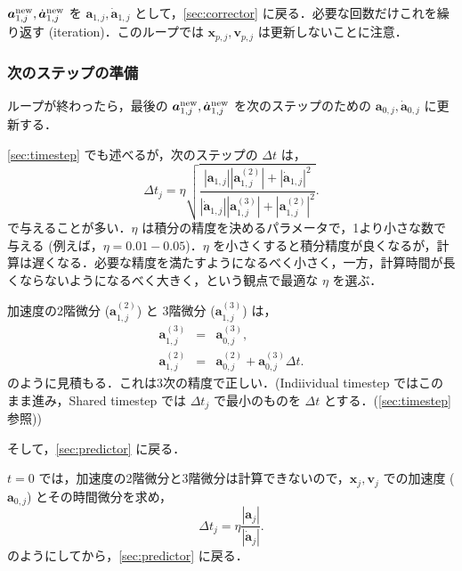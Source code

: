 \documentclass[11pt,a4paper,oneside,onecolumn]{jarticle}
\begin{document}
${\bm a}_{1,j}^{\rm new}, \dot{{\bm a}}_{1,j}^{\rm new}$ を ${\bm a}_{1,j}, \dot{{\bm a}}_{1,j}$ として，\ref{sec:corrector} に戻る．必要な回数だけこれを繰り返す (iteration)．このループでは ${\bm x}_{p,j}, {\bm v}_{p,j}$ は更新しないことに注意．

\subsubsection{次のステップの準備}
ループが終わったら，最後の ${\bm a}_{1,j}^{\rm new}, \dot{{\bm a}}_{1,j}^{\rm new}$ を次のステップのための ${\bm a}_{0,j}, \dot{{\bm a}}_{0,j}$ に更新する．

\ref{sec:timestep} でも述べるが，次のステップの $\Delta t$ は，
\begin{equation}
\Delta t_j = \eta \sqrt{\frac{| {\bm a}_{1,j} | | {\bm a}_{1,j}^{(2)} | + | \dot{{\bm a}}_{1,j} | ^2}{| \dot{{\bm a}}_{1,j} | | {\bm a}_{1,j}^{(3)} | + | {\bm a}_{1,j}^{(2)} | ^2}}.
\end{equation}
で与えることが多い．$\eta$ は積分の精度を決めるパラメータで，1より小さな数で与える (例えば，$\eta = 0.01 - 0.05$)．$\eta$ を小さくすると積分精度が良くなるが，計算は遅くなる．必要な精度を満たすようになるべく小さく，一方，計算時間が長くならないようになるべく大きく，という観点で最適な $\eta$ を選ぶ．

加速度の2階微分 (${\bm a}_{1,j}^{(2)}$) と 3階微分 (${\bm a}_{1,j}^{(3)}$) は，
\begin{eqnarray}
{\bm a}_{1,j}^{(3)} & = & {\bm a}_{0,j}^{(3)}, \\
{\bm a}_{1,j}^{(2)} & = & {\bm a}_{0,j}^{(2)} + {\bm a}_{0,j}^{(3)} \Delta t. 
\end{eqnarray}
のように見積もる．これは3次の精度で正しい．(Indiividual timestep ではこのまま進み，Shared timestep では $\Delta t_j$ で最小のものを $\Delta t$ とする．(\ref{sec:timestep} 参照))

そして，\ref{sec:predictor} に戻る．

$t = 0$ では，加速度の2階微分と3階微分は計算できないので，${\bm x}_j,{\bm v}_j$ での加速度 (${\bm a}_{0,j}$) とその時間微分を求め，
\begin{equation}
\Delta t_j = \eta \frac{|{\bm a}_j|}{|\dot{{\bm a}}_j|}.
\end{equation}
のようにしてから，\ref{sec:predictor} に戻る．
\end{document}
